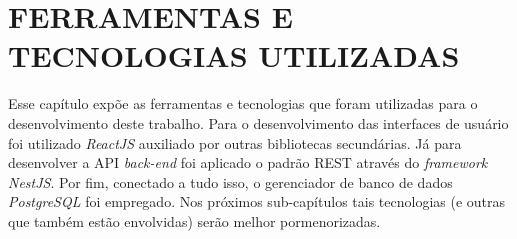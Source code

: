 \chapter{FERRAMENTAS E TECNOLOGIAS UTILIZADAS}
\label{chap:ferramentasDeDesenvolvimento}

Esse capítulo expõe as ferramentas e tecnologias que foram utilizadas para o desenvolvimento deste trabalho. Para o desenvolvimento das interfaces de usuário foi utilizado \textit{ReactJS} auxiliado por outras bibliotecas secundárias. Já para desenvolver a API \textit{back-end} foi aplicado o padrão REST através do \textit{framework NestJS}. Por fim, conectado a tudo isso, o gerenciador de banco de dados \textit{PostgreSQL} foi empregado. Nos próximos sub-capítulos tais tecnologias (e outras que também estão envolvidas) serão melhor pormenorizadas.






